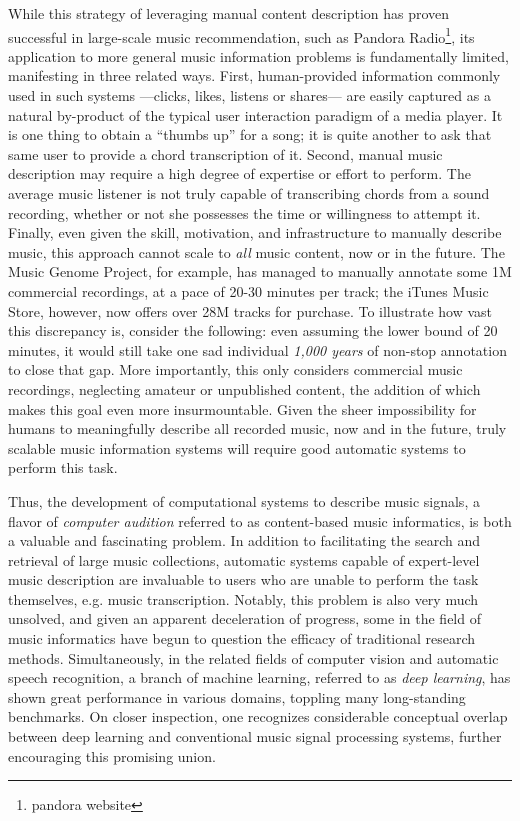 While this strategy of leveraging manual content description has proven successful in large-scale music recommendation, such as Pandora Radio\footnote{pandora website}, its application to more general music information problems is fundamentally limited, manifesting in three related ways.
First, human-provided information commonly used in such systems ---clicks, likes, listens or shares--- are easily captured as a natural by-product of the typical user interaction paradigm of a media player.
It is one thing to obtain a ``thumbs up'' for a song; it is quite another to ask that same user to provide a chord transcription of it.
Second, manual music description may require a high degree of expertise or effort to perform.
The average music listener is not truly capable of transcribing chords from a sound recording, whether or not she possesses the time or willingness to attempt it.
Finally, even given the skill, motivation, and infrastructure to manually describe music, this approach cannot scale to \emph{all} music content, now or in the future.
The Music Genome Project, for example, has managed to manually annotate some 1M commercial recordings, at a pace of 20-30 minutes per track; the iTunes Music Store, however, now offers over 28M tracks for purchase.
To illustrate how vast this discrepancy is, consider the following: even assuming the lower bound of 20 minutes, it would still take one sad individual \emph{1,000 years} of non-stop annotation to close that gap.
More importantly, this only considers commercial music recordings, neglecting amateur or unpublished content, the addition of which makes this goal even more insurmountable.
Given the sheer impossibility for humans to meaningfully describe all recorded music, now and in the future, truly scalable music information systems will require good automatic systems to perform this task.

Thus, the development of computational systems to describe music signals, a flavor of \emph{computer audition} referred to as content-based music informatics, is both a valuable and fascinating problem.
In addition to facilitating the search and retrieval of large music collections, automatic systems capable of expert-level music description are invaluable to users who are unable to perform the task themselves, e.g. music transcription.
Notably, this problem is also very much unsolved, and given an apparent deceleration of progress, some in the field of music informatics have begun to question the efficacy of traditional research methods.
Simultaneously, in the related fields of computer vision and automatic speech recognition, a branch of machine learning, referred to as \emph{deep learning}, has shown great performance in various domains, toppling many long-standing benchmarks.
On closer inspection, one recognizes considerable conceptual overlap between deep learning and conventional music signal processing systems, further encouraging this promising union.

